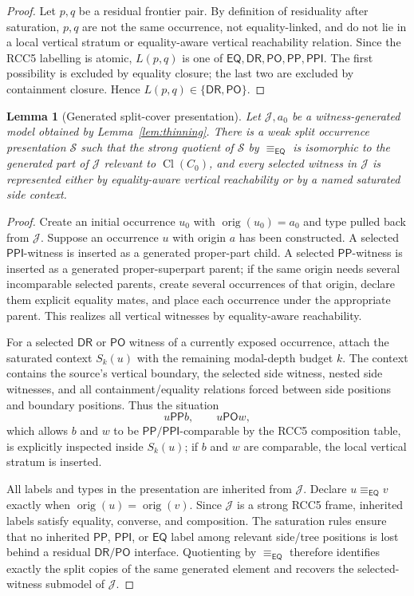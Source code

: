 \documentclass[11pt]{article}
\newtheorem{lemma}[theorem]{Lemma}
\newcommand{\EQ}{\mathsf{EQ}}
\newcommand{\DR}{\mathsf{DR}}
\newcommand{\PO}{\mathsf{PO}}
\newcommand{\PP}{\mathsf{PP}}
\newcommand{\PPI}{\mathsf{PPI}}
\newcommand{\Cl}{\operatorname{Cl}}
\newcommand{\J}{\mathcal J}
\newcommand{\orig}{\operatorname{orig}}
\newcommand{\eqc}{\equiv_{\EQ}}
\begin{document}
\begin{proof}
Let $p,q$ be a residual frontier pair.  By definition of residuality after saturation, $p,q$ are not the same occurrence, not equality-linked, and do not lie in a local vertical stratum or equality-aware vertical reachability relation.  Since the RCC5 labelling is atomic, $L(p,q)$ is one of $\EQ,\DR,\PO,\PP,\PPI$.  The first possibility is excluded by equality closure; the last two are excluded by containment closure.  Hence $L(p,q)\in\{\DR,\PO\}$.
\end{proof}

\begin{lemma}[Generated split-cover presentation]\label{lem:split-cover}
Let $\J,a_0$ be a witness-generated model obtained by Lemma~\ref{lem:thinning}.  There is a weak split occurrence presentation $\mathcal S$ such that the strong quotient of $\mathcal S$ by $\eqc$ is isomorphic to the generated part of $\J$ relevant to $\Cl(C_0)$, and every selected witness in $\J$ is represented either by equality-aware vertical reachability or by a named saturated side context.
\end{lemma}

\begin{proof}
Create an initial occurrence $u_0$ with $\orig(u_0)=a_0$ and type pulled back from $\J$.  Suppose an occurrence $u$ with origin $a$ has been constructed.  A selected $\PPI$-witness is inserted as a generated proper-part child.  A selected $\PP$-witness is inserted as a generated proper-superpart parent; if the same origin needs several incomparable selected parents, create several occurrences of that origin, declare them explicit equality mates, and place each occurrence under the appropriate parent.  This realizes all vertical witnesses by equality-aware reachability.

For a selected $\DR$ or $\PO$ witness of a currently exposed occurrence, attach the saturated context $S_k(u)$ with the remaining modal-depth budget $k$.  The context contains the source's vertical boundary, the selected side witness, nested side witnesses, and all containment/equality relations forced between side positions and boundary positions.  Thus the situation
\[
   u\PP b,
   \qquad
   u\PO w,
\]
which allows $b$ and $w$ to be $\PP/\PPI$-comparable by the RCC5 composition table, is explicitly inspected inside $S_k(u)$; if $b$ and $w$ are comparable, the local vertical stratum is inserted.

All labels and types in the presentation are inherited from $\J$.  Declare $u\eqc v$ exactly when $\orig(u)=\orig(v)$.  Since $\J$ is a strong RCC5 frame, inherited labels satisfy equality, converse, and composition.  The saturation rules ensure that no inherited $\PP$, $\PPI$, or $\EQ$ label among relevant side/tree positions is lost behind a residual $\DR/\PO$ interface.  Quotienting by $\eqc$ therefore identifies exactly the split copies of the same generated element and recovers the selected-witness submodel of $\J$.
\end{proof}
\end{document}
